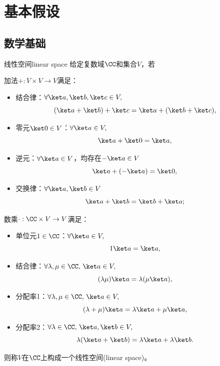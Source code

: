 \chapter{基本假设}

\section{数学基础}

\begin{definition}
    {线性空间}{linear space}
    给定复数域$\CC$和集合$V$，若
    
    加法$+:V\times V\to V$满足：
    \begin{itemize}
        \item 结合律：$\forall\ket a,\ket b,\ket c\in V,$
        \begin{equation}
			(\ket a+\ket b)+\ket c=\ket a+(\ket b+\ket c),
		\end{equation}
        \item 零元$\ket 0\in V$：$\forall\ket a\in V,$
        \begin{equation}
			\ket a+\ket 0=\ket a,
		\end{equation}
        \item 逆元：$\forall\ket a\in V$，均存在$-\ket a\in V$
		\begin{equation}
			\ket a+(-\ket a)=\ket 0,
		\end{equation}
        \item 交换律：$\forall\ket a,\ket b\in V$
		\begin{equation}
			\ket a+\ket b=\ket b+\ket a;
		\end{equation}
    \end{itemize}
    数乘$\cdot:\CC\times V\to V$满足：
    \begin{itemize}
        \item 单位元$1\in\CC$：$\forall\ket a\in V,$
		\begin{equation}
			1\ket a=\ket a,
		\end{equation}
        \item 结合律：$\forall\lambda,\mu\in\CC,\,\ket a\in V,$
		\begin{equation}
			(\lambda\mu)\ket a=\lambda(\mu \ket a),
		\end{equation}
        \item 分配率1：$\forall\lambda,\mu\in\CC,\,\ket a\in V,$
		\begin{equation}
			(\lambda+\mu)\ket a=\lambda \ket a+\mu \ket a,
		\end{equation}
        \item 分配率2：$\forall\lambda\in\CC,\,\ket a,\ket b\in V,$
		\begin{equation}
			\lambda(\ket a+\ket b)=\lambda \ket a+\lambda \ket b.
		\end{equation}
    \end{itemize}
    则称$V$在$\CC$上构成一个线性空间(linear space)。
\end{definition}


